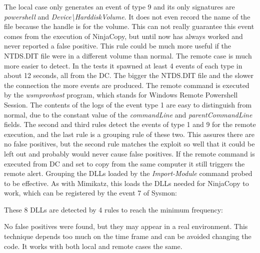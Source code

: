 \linej

\linej
The local case only generates an event of type 9 and its only signatures are \textit{powershell} and \textit{Device{\textbackslash}HarddiskVolume}. It does not even record the name of the file because the handle is for the volume. This can not really guarantee this event comes from the execution of NinjaCopy, but until now has always worked and never reported a false positive. This rule could be much more useful if the NTDS.DIT file were in a different volume than normal.
\linej
\linej
The remote case is much more easier to detect. In the tests it spawned at least 4 events of each type in about 12 seconds, all from the DC.
The bigger the NTDS.DIT file and the slower the connection the more events are produced.
\linej
The remote command is executed by the \textit{wsmprovhost} program, which stands for Windows Remote Powershell Session.
The contents of the logs of the event type 1 are easy to distinguish from normal, due to the constant value of the \textit{commandLine} and \textit{parentCommandLine} fields.
\linej
The second and third rules detect the events of type 1 and 9 for the remote execution, and the last rule is a grouping rule of these two. This assures there are no false positives, but the second rule matches the exploit so well that it could be left out and probably would never cause false positives.
\linej
If the remote command is executed from DC and set to copy from the same computer it still triggers the remote alert.
\linej
\linej
Grouping the DLLs loaded by the \textit{Import-Module} command probed to be effective. As with Mimikatz, this loads the DLLs needed for NinjaCopy to work, which can be registered by the event 7 of Sysmon:

\linej
These 8 DLLs are detected by 4 rules to reach the minimum frequency:

\linej
No false positives were found, but they may appear in a real environment. This technique depends too much on the time frame and can be avoided changing the code. It works with both local and remote cases the same.

